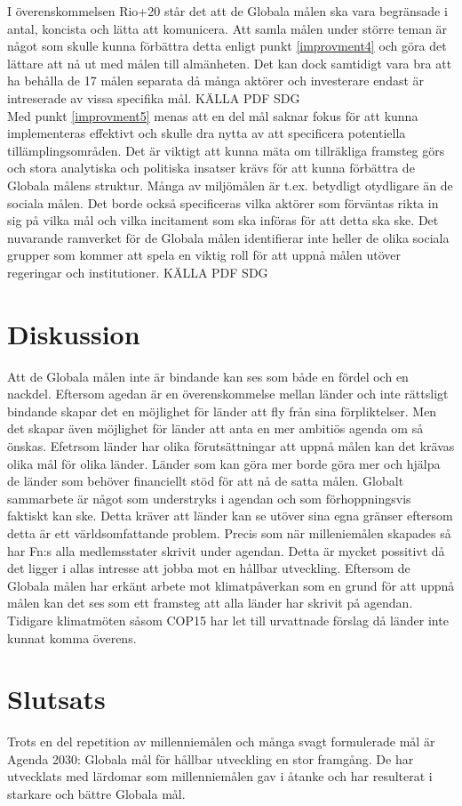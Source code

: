 \documentclass{report}
\begin{document}
I överenskommelsen Rio+20 står det att de Globala målen ska vara begränsade i antal, koncista och lätta att komunicera. Att samla målen under större teman är något som skulle kunna förbättra detta enligt punkt \ref{improvment4} och göra det lättare att nå ut med målen till almänheten. Det kan dock samtidigt vara bra att ha behålla de 17 målen separata då många aktörer och investerare endast är intreserade av vissa specifika mål. KÄLLA PDF SDG\\


Med punkt \ref{improvment5} menas att en del mål saknar fokus för att kunna implementeras effektivt och skulle dra nytta av att specificera potentiella tillämplingsområden. Det är viktigt att kunna mäta om tillräkliga framsteg görs och stora analytiska och politiska insatser krävs för att kunna förbättra de Globala målens struktur. Många av miljömålen  är t.ex. betydligt otydligare än de sociala målen. Det borde också specificeras vilka aktörer som förväntas rikta in sig på vilka mål och vilka incitament som ska införas för att detta ska ske. Det nuvarande ramverket för de Globala målen identifierar inte heller de olika sociala grupper som kommer att spela en viktig roll för att uppnå målen utöver regeringar och institutioner. KÄLLA PDF SDG\\



\newpage
\section{Diskussion}
Att de Globala målen inte är bindande kan ses som både en fördel och en nackdel. Eftersom agedan är en överenskommelse mellan länder och inte rättsligt bindande skapar det en möjlighet för länder att fly från sina förpliktelser. Men det skapar även möjlighet för länder att anta en mer ambitiös agenda om så önskas. \cite{critique} Efetrsom länder har olika förutsättningar att uppnå målen kan det krävas olika mål för olika länder. Länder som kan göra mer borde göra mer och hjälpa de länder som behöver financiellt stöd för att nå de satta målen. Globalt sammarbete är något som understryks i agendan och som förhoppningsvis faktiskt kan ske. Detta kräver att länder kan se utöver sina egna gränser eftersom detta är ett världsomfattande problem. Precis som när milleniemålen skapades så har Fn:s alla medlemsstater skrivit under agendan. Detta är mycket possitivt då det ligger i allas intresse att jobba mot en hållbar utveckling. Eftersom de Globala målen har erkänt arbete mot klimatpåverkan som en grund för att uppnå målen kan det ses som ett framsteg att alla länder har skrivit på agendan. Tidigare klimatmöten såsom COP15 har let till urvattnade förslag då länder inte kunnat komma överens. 


\newpage
\section{Slutsats}
Trots en del repetition av millenniemålen och många svagt formulerade mål är Agenda 2030: Globala mål för hållbar utveckling en stor framgång. De har utvecklats med lärdomar som millenniemålen gav i åtanke och har resulterat i starkare och bättre Globala mål. 

 
\end{document}
